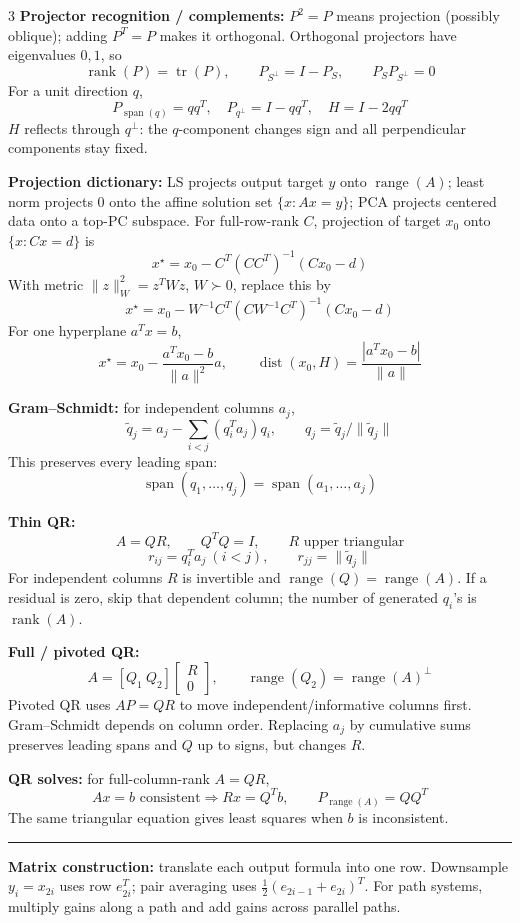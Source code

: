 \documentclass[10pt]{article}
\newcommand{\sect}[1]{\vspace{0.9pt}{\fontsize{7.2}{7.5}\selectfont\textbf{#1}}\vspace{0.25pt}\hrule\vspace{0.8pt}}
\newcommand{\sub}[1]{\textbf{#1}}
\newcommand{\rank}{\operatorname{rank}}
\newcommand{\range}{\operatorname{range}}
\newcommand{\spn}{\operatorname{span}}
\newcommand{\tr}{\operatorname{tr}}
\begin{document}
\begin{multicols*}{3}
\sub{Projector recognition / complements:} \(P^2=P\) means projection
(possibly oblique); adding \(P^T=P\) makes it orthogonal. Orthogonal
projectors have eigenvalues \(0,1\), so
\[
\rank(P)=\tr(P),\qquad P_{S^\perp}=I-P_S,\qquad
P_SP_{S^\perp}=0
\]
For a unit direction \(q\),
\[
P_{\spn(q)}=qq^T,\quad P_{q^\perp}=I-qq^T,\quad
H=I-2qq^T
\]
\(H\) reflects through \(q^\perp\): the \(q\)-component changes sign and
all perpendicular components stay fixed.

\sub{Projection dictionary:} LS projects output target \(y\) onto
\(\range(A)\); least norm projects \(0\) onto the affine solution set
\(\{x:Ax=y\}\); PCA projects centered data onto a top-PC subspace. For
full-row-rank \(C\), projection of target \(x_0\) onto \(\{x:Cx=d\}\) is
\[
x^\star=x_0-C^T(CC^T)^{-1}(Cx_0-d)
\]
With metric \(\|z\|_W^2=z^TWz\), \(W\succ0\), replace this by
\[
x^\star=x_0-W^{-1}C^T(CW^{-1}C^T)^{-1}(Cx_0-d)
\]
For one hyperplane \(a^Tx=b\),
\[
x^\star=x_0-\frac{a^Tx_0-b}{\|a\|^2}a,\qquad
\operatorname{dist}(x_0,H)=\frac{|a^Tx_0-b|}{\|a\|}
\]

\sub{Gram--Schmidt:} for independent columns \(a_j\),
\[
\tilde q_j=a_j-\sum_{i<j}(q_i^Ta_j)q_i,\qquad
q_j=\tilde q_j/\|\tilde q_j\|
\]
This preserves every leading span:
\[
\spn(q_1,\ldots,q_j)=\spn(a_1,\ldots,a_j)
\]

\sub{Thin QR:}
\[
A=QR,\qquad Q^TQ=I,\qquad R\text{ upper triangular}
\]
\[
r_{ij}=q_i^Ta_j\ (i<j),\qquad r_{jj}=\|\tilde q_j\|
\]
For independent columns \(R\) is invertible and
\(\range(Q)=\range(A)\). If a residual is zero, skip that dependent
column; the number of generated \(q_i\)'s is \(\rank(A)\).

\sub{Full / pivoted QR:}
\[
A=[Q_1\ Q_2]\begin{bmatrix}R\\0\end{bmatrix},\qquad
\range(Q_2)=\range(A)^\perp
\]
Pivoted QR uses \(AP=QR\) to move independent/informative columns first.
Gram--Schmidt depends on column order. Replacing \(a_j\) by cumulative
sums preserves leading spans and \(Q\) up to signs, but changes \(R\).

\sub{QR solves:} for full-column-rank \(A=QR\),
\[
Ax=b\text{ consistent}\Rightarrow Rx=Q^Tb,\qquad
P_{\range(A)}=QQ^T
\]
The same triangular equation gives least squares when \(b\) is
inconsistent.

\sect{Homework 1--3 Patterns}
\sub{Matrix construction:} translate each output formula into one row.
Downsample \(y_i=x_{2i}\) uses row \(e_{2i}^T\); pair averaging uses
\(\tfrac12(e_{2i-1}+e_{2i})^T\). For path systems, multiply gains along a
path and add gains across parallel paths.


\end{multicols*}
\end{document}
